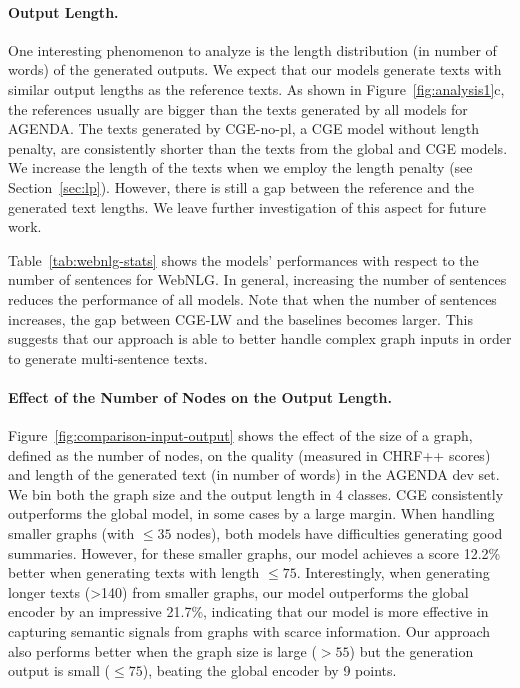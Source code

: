 \documentclass[11pt,a4paper]{article}
\begin{document}
\paragraph{Output Length.} One interesting phenomenon to analyze is the length distribution (in number of words) of the generated outputs. We expect that our models generate texts with similar output lengths as the reference texts. As shown in Figure~\ref{fig:analysis1}c, the references usually are bigger than the texts generated by all models for AGENDA. The texts generated by {\selectfont CGE-no-pl}, a {\selectfont CGE} model without length penalty, are consistently shorter than the texts from the global and {\selectfont CGE} models. We increase the length of the texts when we employ the length penalty (see Section~\ref{sec:lp}). However, there is still a gap between the reference and the generated text lengths. We leave further investigation of this aspect for future work. 


Table~\ref{tab:webnlg-stats} shows the models' performances with respect to the number of sentences for WebNLG. In general, increasing the number of sentences reduces the performance of all models. Note that when the number of sentences increases, the gap between {\selectfont CGE-LW} and the baselines becomes larger. This suggests that our approach is able to better handle complex graph inputs in order to generate multi-sentence texts.



\paragraph{Effect of the Number of Nodes on the Output Length.}
\label{sec:relations_input_output}
Figure~\ref{fig:comparison-input-output} shows the effect of the size of a graph, defined as the number of nodes, on the quality (measured in CHRF++ scores) and length of the generated text (in number of words) in the AGENDA dev set. We bin both the graph size and the output length in 4 classes. {\selectfont CGE} consistently outperforms the global model, in some cases by a large margin. When handling smaller graphs (with $\leq35$ nodes), both models have difficulties generating good summaries. However, for these smaller graphs, our model achieves a score 12.2\% better when generating texts with length $\leq75$. Interestingly, when generating longer texts (>140) from smaller graphs, our model outperforms the global encoder by an impressive 21.7\%, indicating that our model is more effective in capturing semantic signals from graphs with scarce information. Our approach also performs better when the graph size is large ($> 55$) but the generation output is small ($\leq75$), beating the global encoder by 9 points.
\end{document}
